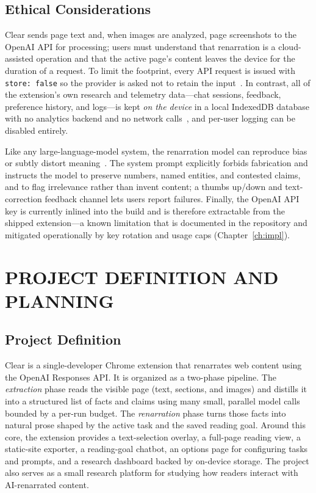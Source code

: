 \documentclass[a4paper,12pt]{report}
\begin{document}
\section{Ethical Considerations}
Clear sends page text and, when images are analyzed, page screenshots to the
OpenAI API for processing; users must understand that renarration is a
cloud-assisted operation and that the active page's content leaves the device for
the duration of a request. To limit the footprint, every API request is issued
with \texttt{store: false} so the provider is asked not to retain the
input~\cite{openai}. In contrast, all of the extension's own research and
telemetry data---chat sessions, feedback, preference history, and logs---is kept
\emph{on the device} in a local IndexedDB database with no analytics backend and
no network calls~\cite{indexeddb}, and per-user logging can be disabled entirely.

Like any large-language-model system, the renarration model can reproduce bias or
subtly distort meaning~\cite{parrots}. The system prompt explicitly forbids
fabrication and instructs the model to preserve numbers, named entities, and
contested claims, and to flag irrelevance rather than invent content; a thumbs
up/down and text-correction feedback channel lets users report failures. Finally,
the OpenAI API key is currently inlined into the build and is therefore
extractable from the shipped extension---a known limitation that is documented in
the repository and mitigated operationally by key rotation and usage caps
(Chapter~\ref{ch:impl}).

\chapter{PROJECT DEFINITION AND PLANNING}

\section{Project Definition}
Clear is a single-developer Chrome extension that renarrates web content using
the OpenAI Responses API. It is organized as a two-phase pipeline. The
\emph{extraction} phase reads the visible page (text, sections, and images) and
distills it into a structured list of facts and claims using many small,
parallel model calls bounded by a per-run budget. The \emph{renarration} phase
turns those facts into natural prose shaped by the active task and the saved
reading goal. Around this core, the extension provides a text-selection overlay,
a full-page reading view, a static-site exporter, a reading-goal chatbot, an
options page for configuring tasks and prompts, and a research dashboard backed by
on-device storage. The project also serves as a small research platform for
studying how readers interact with AI-renarrated content.
\end{document}
